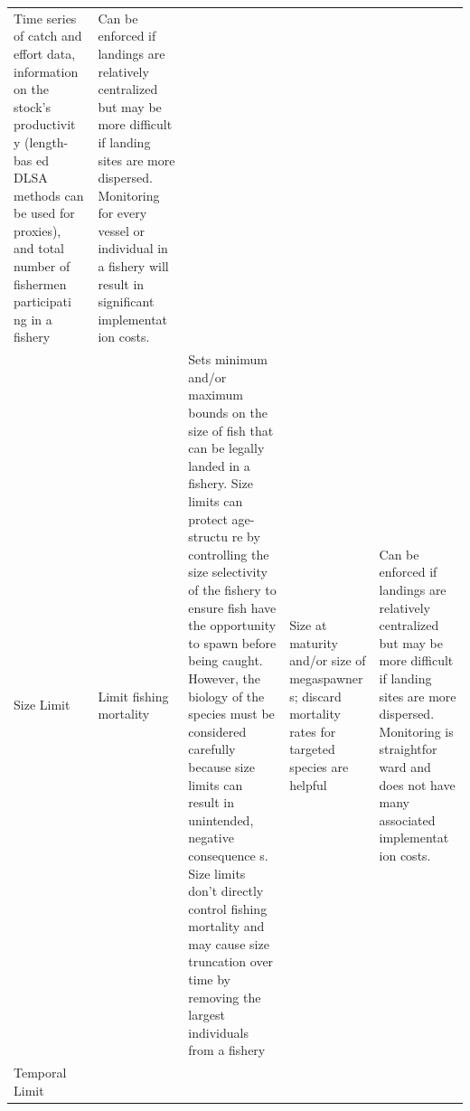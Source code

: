 \documentclass[]{book}
\begin{document}
\begin{longtable}[]{@{}lllll@{}}
\begin{minipage}[t]{0.17\columnwidth}
Time series of catch and effort data, information on the stock's
productivit y (length-bas ed DLSA methods can be used for proxies), and
total number of fishermen participati ng in a fishery\strut
\end{minipage} & \begin{minipage}[t]{0.17\columnwidth}\raggedright\strut
Can be enforced if landings are relatively centralized but may be more
difficult if landing sites are more dispersed. Monitoring for every
vessel or individual in a fishery will result in significant implementat
ion costs.\strut
\end{minipage}\tabularnewline
\begin{minipage}[t]{0.17\columnwidth}\raggedright\strut
Size Limit\strut
\end{minipage} & \begin{minipage}[t]{0.17\columnwidth}\raggedright\strut
Limit fishing mortality\strut
\end{minipage} & \begin{minipage}[t]{0.17\columnwidth}\raggedright\strut
Sets minimum and/or maximum bounds on the size of fish that can be
legally landed in a fishery. Size limits can protect age-structu re by
controlling the size selectivity of the fishery to ensure fish have the
opportunity to spawn before being caught. However, the biology of the
species must be considered carefully because size limits can result in
unintended, negative consequence s. Size limits don't directly control
fishing mortality and may cause size truncation over time by removing
the largest individuals from a fishery\strut
\end{minipage} & \begin{minipage}[t]{0.17\columnwidth}\raggedright\strut
Size at maturity and/or size of megaspawner s; discard mortality rates
for targeted species are helpful\strut
\end{minipage} & \begin{minipage}[t]{0.17\columnwidth}\raggedright\strut
Can be enforced if landings are relatively centralized but may be more
difficult if landing sites are more dispersed. Monitoring is straightfor
ward and does not have many associated implementat ion costs.\strut
\end{minipage}\tabularnewline
\begin{minipage}[t]{0.17\columnwidth}\raggedright\strut
Temporal Limit\strut
\end{minipage} & \begin{minipage}[t]{0.17\columnwidth}\raggedright\strut

\end{minipage}
\end{longtable}
\end{document}
